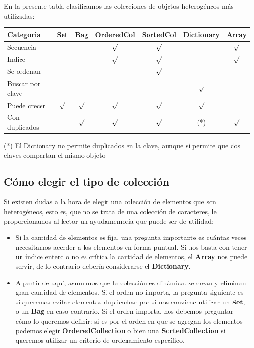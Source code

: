 \documentclass[a4paper,12pt]{book}
\begin{document}
En la presente tabla clasificamos las colecciones de objetos heterogéneos más utilizadas:
\newline

\begin{tabular}{|l|c|c|c|c|c|c|}
\hline
\cellcolor[gray]{0.8}
Categoria & \cellcolor[gray]{0.8} Set & \cellcolor[gray]{0.8} Bag & \cellcolor[gray]{0.8} OrderedCol
& \cellcolor[gray]{0.8} SortedCol & \cellcolor[gray]{0.8} Dictionary
& \cellcolor[gray]{0.8} Array \\
\hline
Secuencia & & & $\surd$ & $\surd$ & & $\surd$ \\
\hline
Indice & & & $\surd$ & $\surd$ & & $\surd$ \\
\hline
Se ordenan & & & & $\surd$ & & \\
\hline
Buscar por clave & & & & & $\surd$ & \\
\hline
Puede crecer & $\surd$ & $\surd$ & $\surd$ & $\surd$ & $\surd$ & \\
\hline
Con duplicados & & $\surd$ & $\surd$ & $\surd$ & (*) & $\surd$ \\
\hline
\end{tabular}
\newline\newline

(*) El Dictionary no permite duplicados en la clave, aunque sí permite que dos claves compartan el mismo objeto

\subsection{Cómo elegir el tipo de colección}

Si existen dudas a la hora de elegir una colección de elementos que son heterogéneos, esto es, que no se trata
de una colección de caracteres, le proporcionamos al lector un ayudamemoria que puede ser de utilidad:

\begin{itemize}
 \item Si la cantidad de elementos es fija, una pregunta importante es cuántas veces necesitamos acceder
 a los elementos en forma puntual. Si nos basta con tener un índice entero o no es crítica la cantidad
 de elementos, el \textbf{Array} nos puede servir, de lo contrario debería considerarse el \textbf{Dictionary}.
 \item A partir de aquí, asumimos que la colección es dinámica: se crean y eliminan gran cantidad de elementos.
 Si el orden no importa, la pregunta siguiente es si queremos evitar elementos duplicados: por sí nos conviene
 utilizar un \textbf{Set}, o un \textbf{Bag} en caso contrario. Si el orden importa, nos debemos preguntar cómo
 lo queremos definir: si es por el orden en que se agregan los elementos podemos elegir \textbf{OrderedCollection}
 o bien una \textbf{SortedCollection} si queremos utilizar un criterio de ordenamiento específico. 
\end{itemize}
\end{document}
